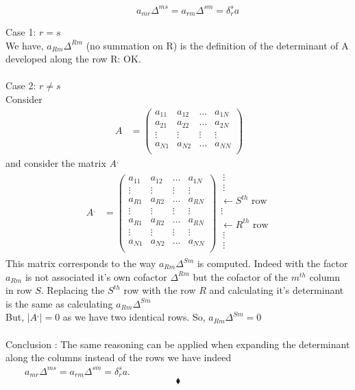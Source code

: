 \begin{tcolorbox}
           $$\quad\quad a_{mr}\Delta^{ms} = a_{rm}\Delta^{sm} = \delta^s_r a$$
\end{tcolorbox}
Case 1: $r =s$\\
We have, $a_{Rm}\Delta^{Rm}$ (no summation on R) is the definition of the determinant of A developed along the row R: OK.\\\\
Case 2: $r \neq s$\\
Consider
\begin{align}
\ A &= \begin{pmatrix}
 a_{11} & a_{12}&\dots&a_{1N} \\
a_{21} & a_{22}&\dots&a_{2N} \\
\vdots & \vdots &\vdots & \vdots \\
a_{N1} & a_{N2}&\dots&a_{NN} \\
\end{pmatrix}
\end{align}
and consider the matrix $A^,$
\begin{align}
\ A^, &= \begin{pmatrix}
 a_{11} & a_{12}&\dots&a_{1N} \\
 \vdots & \vdots &\vdots & \vdots \\
a_{R1} & a_{R2}&\dots&a_{RN} \\
\vdots & \vdots &\vdots & \vdots \\
a_{R1} & a_{R2}&\dots&a_{RN} \\
\vdots & \vdots &\vdots & \vdots \\
a_{N1} & a_{N2}&\dots&a_{NN} \\
\end{pmatrix}
\begin{array}{c}
\ \vdots\\
\ \vdots\\
\leftarrow S^{th}\text{ row}\\
\vdots\\
\leftarrow R^{th}\text{ row}\\
\ \vdots\\
\ \vdots\\
\end{array}
\end{align}
This matrix corresponds to the way $a_{Rm}\Delta^{Sm}$ is computed. Indeed with the factor $a_{Rm}$ is not associated it's own cofactor $\Delta^{Rm}$ but the cofactor of the $m^{th}$ column in row $S$. Replacing the $S^{th}$ row with the row $R$ and calculating it's determinant is the same as calculating $a_{Rm}\Delta^{Sm}$\\
But, $|A^,| = 0$ as we have two identical rows. So, $a_{Rm}\Delta^{Sm} = 0$\\\\
Conclusion : The same reasoning can be applied when expanding the determinant along the columns instead of the rows we have indeed $\quad\quad a_{mr}\Delta^{ms} = a_{rm}\Delta^{sm} = \delta^s_r a$.
$$\blacklozenge$$
\newpage


